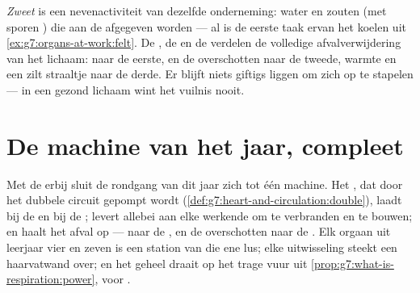 \begin{remark}\label{rem:g7:removing-wastes:sweat}
\emph{Zweet} is een nevenactiviteit van dezelfde
onderneming: water en zouten (met sporen ) die aan de  afgegeven
worden --- al is de eerste taak ervan het koelen uit
\cref{ex:g7:organs-at-work:felt}. De , de  en de  verdelen
de volledige afvalverwijdering van het lichaam:  naar de
eerste,  en de overschotten naar de tweede, warmte en een zilt
straaltje naar de derde. Er blijft niets giftigs liggen om zich op te
stapelen --- in een gezond lichaam wint het vuilnis nooit.
\end{remark}

\section{De machine van het jaar, compleet}

\begin{proposition}\label{prop:g7:removing-wastes:complete}
Met de  erbij sluit de rondgang van dit jaar zich tot één machine.
Het , dat door het dubbele circuit gepompt wordt
(\cref{def:g7:heart-and-circulation:double}), laadt  bij de
 en  bij de ; levert allebei aan
elke werkende  om te verbranden en te bouwen; en haalt het afval op ---
 naar de ,  en de overschotten naar de .
Elk orgaan uit leerjaar vier en zeven is een station van die ene lus; elke
uitwisseling steekt een haarvatwand over; en het geheel draait op het
trage vuur uit \cref{prop:g7:what-is-respiration:power},  voor .
\end{proposition}
\admitted

